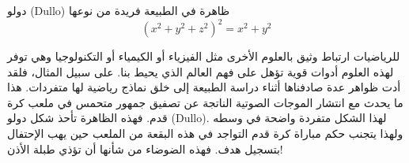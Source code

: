 \begin{surferPage}[دولو]{دولو (Dullo)}
ظاهرة في الطبيعة فريدة من نوعها\\
\smallskip
\[(x^2+ y^2+ z^2)^2	= x^2+ y^2\]

\singlespacing
للرياضيات ارتباط وثيق بالعلوم الأخرى مثل الفيزياء أو الكيمياء أو التكنولوجيا وهي توفر لهذه العلوم أدوات قوية تؤهل على فهم العالم الذي يحيط بنا.
\singlespacing
على سبيل المثال، فلقد أدت ظواهر عدة صادفناها أثناء دراسة الطبيعة إلى خلق نماذج رياضية لها متفردات.
\singlespacing
هذا ما يحدث مع انتشار الموجات الصوتية الناتجة عن تصفيق جمهور متحمس في ملعب كرة قدم. فهذه الظاهرة تأحذ شكل دولو \textenglish{(Dullo)}. لهذا الشكل متفردة واضحة في وسطه ولهذا يتجنب حكم مباراة كرة قدم التواجد في هذه البقعة من الملعب حين يهب الإحتفال بتسجيل هدف. فهذه الضوضاء من شأنها أن تؤذي طبلة الأذن!
\end{surferPage}
